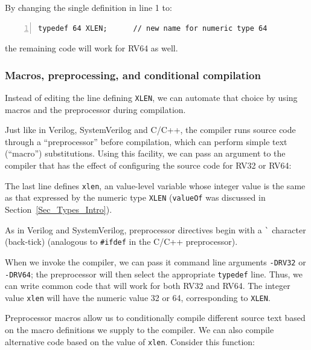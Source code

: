 By changing the single definition in line 1 to:

{\footnotesize
\begin{Verbatim}[frame=single, numbers=left]
   typedef 64 XLEN;      // new name for numeric type 64
\end{Verbatim}
}

the remaining code will work for RV64 as well.


\subsubsection{Macros, preprocessing, and conditional compilation}

\label{BSV_Conditional_compilation}


Instead of editing the line defining {\tt XLEN}, we can automate that
choice by using macros and the preprocessor during compilation.

Just like in Verilog, SystemVerilog and C/C++, the {\bsc} compiler
runs {\BSV} source code through a ``preprocessor'' before compilation,
which can perform simple text (``macro'') substitutions.  Using this
facility, we can pass an argument to the compiler that has the effect
of configuring the source code for RV32 or RV64:


The last line defines \verb|xlen|, an value-level variable whose
integer value is the same as that expressed by the numeric type
\verb|XLEN| ({\tt valueOf} was discussed in
Section~\ref{Sec_Types_Intro}).

As in Verilog and SystemVerilog, preprocessor directives begin with a
\verb|`| character (back-tick) (analogous to \verb|#ifdef| in the
C/C++ preprocessor).

When we invoke the {\bsc} compiler, we can pass it command line
arguments \verb|-DRV32| or \verb|-DRV64|; the preprocessor will then
select the appropriate \verb|typedef| line.  Thus, we can write common
code that will work for both RV32 and RV64.  The integer value
\verb|xlen| will have the numeric value 32 or 64, corresponding to
{\tt XLEN}.

Preprocessor macros allow us to conditionally compile different source
text based on the macro definitions we supply to the compiler.  We can
also compile alternative code based on the value of \verb|xlen|.
Consider this function:

